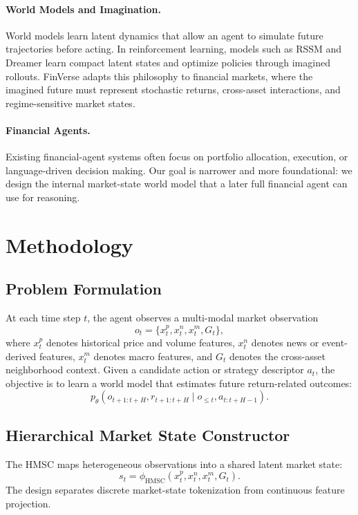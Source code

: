 \documentclass[letterpaper]{article}
\begin{document}
\paragraph{World Models and Imagination.}
World models learn latent dynamics that allow an agent to simulate future trajectories before acting. In reinforcement learning, models such as RSSM and Dreamer learn compact latent states and optimize policies through imagined rollouts. FinVerse adapts this philosophy to financial markets, where the imagined future must represent stochastic returns, cross-asset interactions, and regime-sensitive market states.

\paragraph{Financial Agents.}
Existing financial-agent systems often focus on portfolio allocation, execution, or language-driven decision making. Our goal is narrower and more foundational: we design the internal market-state world model that a later full financial agent can use for reasoning.

\section{Methodology}
\subsection{Problem Formulation}
At each time step $t$, the agent observes a multi-modal market observation
\begin{equation}
    o_t = \{x_t^{p}, x_t^{n}, x_t^{m}, G_t\},
\end{equation}
where $x_t^{p}$ denotes historical price and volume features, $x_t^{n}$ denotes news or event-derived features, $x_t^{m}$ denotes macro features, and $G_t$ denotes the cross-asset neighborhood context. Given a candidate action or strategy descriptor $a_t$, the objective is to learn a world model that estimates future return-related outcomes:
\begin{equation}
    p_\theta(o_{t+1:t+H}, r_{t+1:t+H} \mid o_{\leq t}, a_{t:t+H-1}).
\end{equation}

\subsection{Hierarchical Market State Constructor}
The HMSC maps heterogeneous observations into a shared latent market state:
\begin{equation}
    s_t = \phi_{\mathrm{HMSC}}(x_t^{p}, x_t^{n}, x_t^{m}, G_t).
\end{equation}
The design separates discrete market-state tokenization from continuous feature projection.
\end{document}
